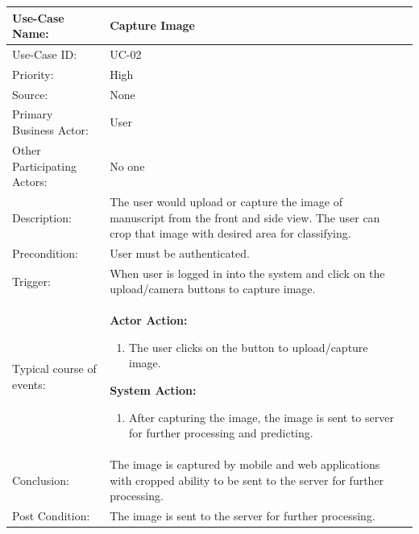 \begin{table}[H]
    \centering
    \begin{tabular}{|l|p{}|p{}|}
    	\hline
    	Use-Case Name: & Capture Image\\ \hline
    	Use-Case ID:& UC-02 \\\hline
    	Priority:& High\\ \hline
    	Source:& None \\ \hline
    	Primary Business Actor: & User \\ \hline
    	Other Participating Actors:&  No one\\ \hline
    	Description:&  The user would upload or capture the image of manuscript from the front and side view. The user can crop that image with desired area for classifying.  \\ \hline
    	Precondition:&  User must be authenticated. \\ \hline
    	Trigger:&  When user is logged in into the system and click on the upload/camera buttons to capture image. \\ \hline 
    	Typical course of events:&  \textbf{Actor Action:}
    	\begin{enumerate}
    		\item 	The user clicks on the button to upload/capture image.
    	\end{enumerate}
    
    	\vspace{2mm}
    	
    	\textbf{System Action: }
    	\begin{enumerate}
    		\item After capturing the image, the image is sent to server for further processing and predicting.
    	\end{enumerate}
    	\\ \hline
    	Conclusion:  & The image is captured by mobile and web applications with cropped ability to be sent to the server for further processing.\\ \hline
    	Post Condition: & The image is sent to the server for further processing. \\ \hline
    \end{tabular}\\
\end{table}

\clearpage

